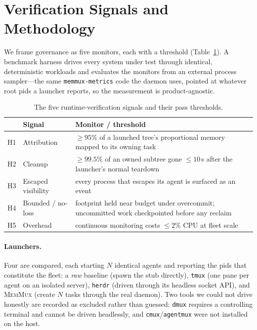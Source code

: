 \documentclass[11pt]{article}
\newcommand{\sys}{\textsc{MemMux}}
\newcommand{\code}[1]{\texttt{#1}}
\begin{document}
\section{Verification Signals and Methodology}
\label{sec:signals}
\label{sec:method}

We frame governance as five monitors, each with a threshold (Table~\ref{tab:signals}). A benchmark
harness drives every system under test through identical, deterministic workloads and evaluates the
monitors from an external process sampler---the same \code{memmux-metrics} code the daemon uses,
pointed at whatever root pids a launcher reports, so the measurement is product-agnostic.

\begin{table}[t]
\centering
\small
\begin{tabular}{@{}llp{6.4cm}@{}}
\toprule
& \textbf{Signal} & \textbf{Monitor / threshold} \\
\midrule
H1 & Attribution        & $\geq 95\%$ of a launched tree's proportional memory mapped to its owning task \\
H2 & Cleanup            & $\geq 99.5\%$ of an owned subtree gone $\leq 10$\,s after the launcher's normal teardown \\
H3 & Escaped visibility & every process that escapes its agent is surfaced as an event \\
H4 & Bounded / no-loss  & footprint held near budget under overcommit; uncommitted work checkpointed before any reclaim \\
H5 & Overhead           & continuous monitoring costs $\leq 2\%$ CPU at fleet scale \\
\bottomrule
\end{tabular}
\caption{The five runtime-verification signals and their pass thresholds.}
\label{tab:signals}
\end{table}

\paragraph{Launchers.} Four are compared, each starting $N$ identical agents and reporting the pids
that constitute the fleet: a \emph{raw} baseline (spawn the stub directly), \code{tmux} (one pane per
agent on an isolated server), \code{herdr} (driven through its headless socket API), and \sys{}
(create $N$ tasks through the real daemon). Two tools we could not drive honestly are recorded as
excluded rather than guessed: \code{dmux} requires a controlling terminal and cannot be driven
head\-lessly, and \code{cmux}/\code{agentmux} were not installed on the host.
\end{document}
